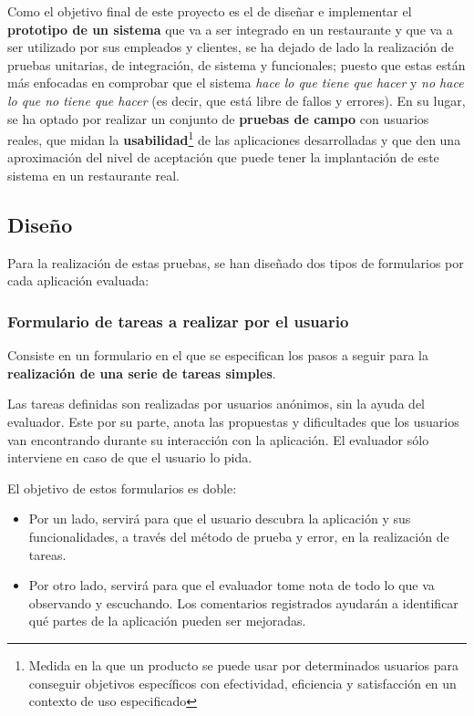 Como el objetivo final de este proyecto es el de diseñar e implementar el 
\textbf{prototipo de un sistema} que va a ser integrado en un restaurante y que 
va a ser utilizado por sus empleados y clientes, se ha dejado de lado la 
realización de pruebas unitarias, de integración, de sistema y funcionales; 
puesto que estas están más enfocadas en comprobar que el sistema
\emph{hace lo que tiene que hacer} y \emph{no hace lo que no tiene que hacer}
(es decir, que está libre de fallos y errores). En su lugar, se ha optado por
realizar un conjunto de \textbf{pruebas de campo} con usuarios reales, que 
midan la \textbf{usabilidad}\footnote{Medida en la que un producto se puede 
usar por determinados usuarios para conseguir objetivos específicos con 
efectividad, eficiencia y satisfacción en un contexto de uso especificado} de 
las aplicaciones desarrolladas y que den una aproximación del nivel de 
aceptación que puede tener la implantación de este sistema en un restaurante 
real.

\subsection{Diseño}
Para la realización de estas pruebas, se han diseñado dos tipos de formularios
por cada aplicación evaluada:

\subsubsection{Formulario de tareas a realizar por el usuario}
Consiste en un formulario en el que se especifican los pasos a seguir para
la \textbf{realización de una serie de tareas simples}.

Las tareas definidas son realizadas por usuarios anónimos, sin la ayuda del 
evaluador. Este por su parte, anota las propuestas y dificultades que los
usuarios van encontrando durante su interacción con la aplicación. El evaluador 
sólo interviene en caso de que el usuario lo pida.

El objetivo de estos formularios es doble:
  \begin{itemize}
  \item Por un lado, servirá para que el usuario descubra la aplicación y sus
  funcionalidades, a través del método de prueba y error, en la realización de
  tareas.
  \item Por otro lado, servirá para que el evaluador tome nota de todo lo que
  va observando y escuchando. Los comentarios registrados ayudarán a
  identificar qué partes de la aplicación pueden ser mejoradas.
  \end{itemize}

